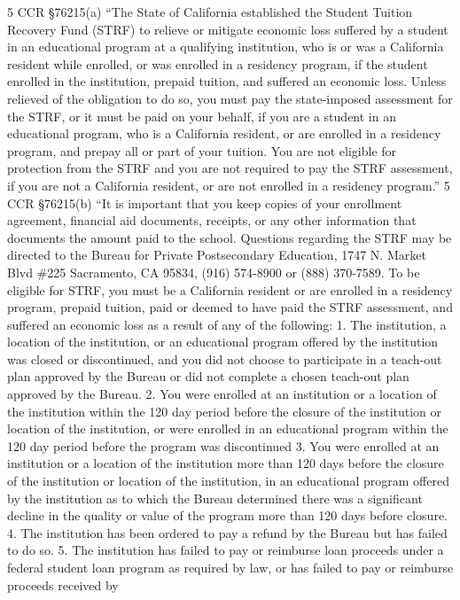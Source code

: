 \documentclass[
  letterpaper,
]{scrbook}
\begin{document}
5 CCR §76215(a) ``The State of California established the Student
Tuition Recovery Fund (STRF) to relieve or mitigate economic loss
suffered by a student in an educational program at a qualifying
institution, who is or was a California resident while enrolled, or was
enrolled in a residency program, if the student enrolled in the
institution, prepaid tuition, and suffered an economic loss. Unless
relieved of the obligation to do so, you must pay the state-imposed
assessment for the STRF, or it must be paid on your behalf, if you are a
student in an educational program, who is a California resident, or are
enrolled in a residency program, and prepay all or part of your tuition.
You are not eligible for protection from the STRF and you are not
required to pay the STRF assessment, if you are not a California
resident, or are not enrolled in a residency program.'' 5 CCR §76215(b)
``It is important that you keep copies of your enrollment agreement,
financial aid documents, receipts, or any other information that
documents the amount paid to the school. Questions regarding the STRF
may be directed to the Bureau for Private Postsecondary Education, 1747
N. Market Blvd \#225 Sacramento, CA 95834, (916) 574-8900 or (888)
370-7589. To be eligible for STRF, you must be a California resident or
are enrolled in a residency program, prepaid tuition, paid or deemed to
have paid the STRF assessment, and suffered an economic loss as a result
of any of the following: 1. The institution, a location of the
institution, or an educational program offered by the institution was
closed or discontinued, and you did not choose to participate in a
teach-out plan approved by the Bureau or did not complete a chosen
teach-out plan approved by the Bureau. 2. You were enrolled at an
institution or a location of the institution within the 120 day period
before the closure of the institution or location of the institution, or
were enrolled in an educational program within the 120 day period before
the program was discontinued 3. You were enrolled at an institution or a
location of the institution more than 120 days before the closure of the
institution or location of the institution, in an educational program
offered by the institution as to which the Bureau determined there was a
significant decline in the quality or value of the program more than 120
days before closure. 4. The institution has been ordered to pay a refund
by the Bureau but has failed to do so. 5. The institution has failed to
pay or reimburse loan proceeds under a federal student loan program as
required by law, or has failed to pay or reimburse proceeds received by
\end{document}
